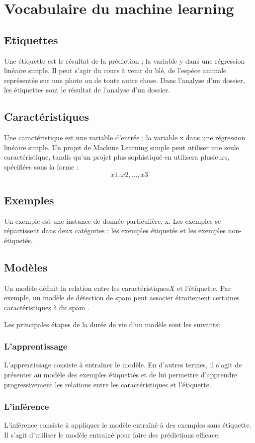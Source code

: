 
\section{Vocabulaire du machine learning}

\subsection{Etiquettes}
Une étiquette est le résultat de la prédiction ; la variable y dans une régression 
linéaire simple. Il peut s'agir du cours à venir du blé, de l'espèce animale représentée 
sur une photo ou de toute autre chose. 
Dans l'analyse d'un dossier, les étiquettes sont le résultat de l'analyse d'un
dossier.

\subsection{Caractéristiques}
Une caractéristique est une variable d'entrée ; la variable x dans une régression linéaire 
simple. Un projet de Machine Learning simple peut utiliser une seule caractéristique, 
tandis qu'un projet plus sophistiqué en utilisera plusieurs, spécifiées sous la forme :
$$
x1, x2, \ldots{}, x3
$$
\subsection{Exemples}
Un exemple est une instance de donnée particulière, x. Les exemples se répartissent dans deux
catégories : les exemples étiquetés et les exemples non-étiquetés.

\subsection{Modèles}
Un modèle définit la relation entre les caractéristiques$X$ et l'étiquette.
Par exemple, un modèle de détection de spam peut associer étroitement certaines
caractéristiques à du \og spam \fg.

Les principales étapes de la durée de vie d'un modèle sont les suivants:
\subsubsection{L'apprentissage}
L'apprentissage consiste à entraîner le modèle. En d'autres termes, il s'agit de
présenter au modèle des exemples étiquettés et de lui permettre d'apprendre
progressivement les relations entre les caractéristiques et l'étiquette.

\subsubsection{L'inférence}

L'inférence consiste à appliquer le modèle entraîné à des exemples sans
étiquette. Il s'agit  d'utiliser le modèle entrainé pour faire des prédictions
efficace.

